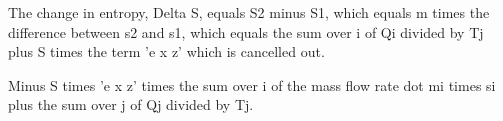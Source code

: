 The change in entropy, Delta S, equals S2 minus S1, which equals m times the difference between s2 and s1, which equals the sum over i of Qi divided by Tj plus S times the term 'e x z' which is cancelled out.

Minus S times 'e x z' times the sum over i of the mass flow rate dot mi times si plus the sum over j of Qj divided by Tj.